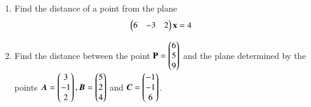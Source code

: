 \begin{enumerate}[label=\arabic*.,ref=\thesubsection.\theenumi]
\item Find the distance of a point  from the plane
\begin{align}
\begin{pmatrix}6 & -3 & 2\end{pmatrix}\mathbf{x}=4
\end{align}
%

\item Find the distance between the point $\mathbf{P}=\begin{pmatrix}6\\5\\9\end{pmatrix}$ and the plane determined by the points $\bm{A}=\begin{pmatrix}3\\-1\\2\end{pmatrix}, \bm{B}=\begin{pmatrix}5\\2\\4\end{pmatrix}$ and $\bm{C}=\begin{pmatrix}-1\\-1\\6\end{pmatrix}$.
%
%
\end{enumerate}

